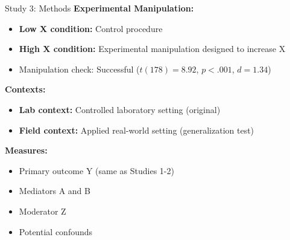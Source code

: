 \documentclass[aspectratio=169,12pt]{beamer}
\begin{document}
\begin{frame}{Study 3: Methods}
  \textbf{Experimental Manipulation:}
  \begin{itemize}
    \item \textbf{Low X condition:} Control procedure
    \item \textbf{High X condition:} Experimental manipulation designed to increase X
    \item Manipulation check: Successful ($t(178) = 8.92$, $p < .001$, $d = 1.34$)
  \end{itemize}
  
  \vspace{0.5cm}
  
  \textbf{Contexts:}
  \begin{itemize}
    \item \textbf{Lab context:} Controlled laboratory setting (original)
    \item \textbf{Field context:} Applied real-world setting (generalization test)
  \end{itemize}
  
  \vspace{0.5cm}
  
  \textbf{Measures:}
  \begin{itemize}
    \item Primary outcome Y (same as Studies 1-2)
    \item Mediators A and B
    \item Moderator Z
    \item Potential confounds
  \end{itemize}
\end{frame}
\end{document}
